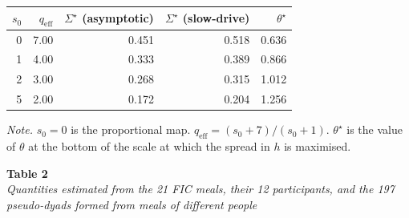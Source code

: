 \documentclass[12pt]{article}
\begin{document}
\vspace{0.1in}
\begingroup\singlespacing
\noindent\begin{tabular}{rrrrr}
\toprule
$s_0$ & $q_{\mathrm{eff}}$ & $\Sigma^\star$ (asymptotic) & $\Sigma^\star$ (slow-drive) & $\theta^\star$\\
\midrule
0 & 7.00 & 0.451 & 0.518 & 0.636\\
1 & 4.00 & 0.333 & 0.389 & 0.866\\
2 & 3.00 & 0.268 & 0.315 & 1.012\\
5 & 2.00 & 0.172 & 0.204 & 1.256\\
\bottomrule
\end{tabular}

\vspace{0.1in}
\noindent\emph{Note.} $s_0=0$ is the proportional map. $q_{\mathrm{eff}}=(s_0+7)/(s_0+1)$.
$\theta^\star$ is the value of $\theta$ at the bottom of the scale at which the
spread in $h$ is maximised.\par
\endgroup

\vspace{0.4in}

\noindent\textbf{Table 2}\\
\emph{Quantities estimated from the 21 FIC meals, their 12 participants, and the 197 pseudo-dyads formed from meals of different people}
\end{document}
